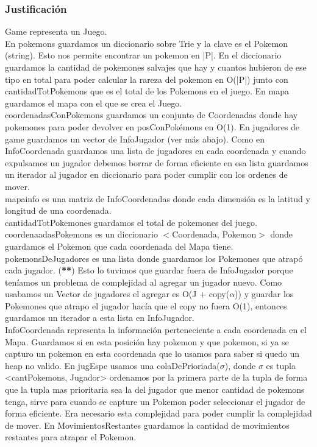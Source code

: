 \begin{Representacion}

\subsubsection{Justificación}
Game representa un Juego.\\
En pokemons guardamos un diccionario sobre Trie y la clave es el Pokemon (string). Esto nos permite encontrar un pokemon en |P|. En el diccionario guardamos la cantidad de pokemones salvajes que hay y cuantos hubieron de ese tipo en total para poder calcular la rareza del pokemon en O(|P|) junto con cantidadTotPokemons que es el total de los Pokemons en el juego.
En mapa guardamos el mapa con el que se crea el Juego.\\
coordenadasConPokemons guardamos un conjunto de Coordenadas donde hay pokemones para poder devolver en posConPok\'emons en O(1).
En jugadores de game guardamos un vector de InfoJugador (ver m\'as abajo). Como en InfoCoordenada guardamos una lista de jugadores en cada coordenada y cuando expulsamos un jugador debemos borrar de forma eficiente en esa lista guardamos un iterador al jugador en diccionario para poder cumplir con los ordenes de mover.\\
mapainfo es una matriz de InfoCoordenadas donde cada dimensi\'on es la latitud y longitud de una coordenada.\\
cantidadTotPokemones guardamos el total de pokemones del juego.\\
coordenaadasPokemons es un diccionario $<$Coordenada, Pokemon$>$ donde guardamos el Pokemon que cada coordenada del Mapa tiene.\\
pokemonsDeJugadores es una lista donde guardamos los Pokemones que atrapó cada jugador. (\textbf{**}) Esto lo tuvimos que guardar fuera de InfoJugador porque ten\'iamos un problema de complejidad al agregar un jugador nuevo. Como usabamos un Vector de jugadores el agregar es O(J + copy($\alpha$)) y guardar los Pokemones que atrapo el jugador hacía que el copy no fuera O(1), entonces guardamos un iterador a esta lista en InfoJugador.\\
InfoCoordenada representa la informaci\'on perteneciente a cada coordenada en el Mapa. Guardamos si en esta posici\'on hay pokemon y que pokemon, si ya se capturo un pokemon en esta coordenada que lo usamos para saber si quedo un heap no valido. En jugEspe usamos una colaDePrioriada($\sigma$), donde $\sigma$ es tupla <cantPokemons, Jugador> ordenamos por la primera parte de la tupla de forma que la tupla mas prioritaria sea la del jugador que menor cantidad de pokemons tenga, sirve para cuando se capture un Pokemon poder seleccionar el jugador de forma eficiente. Era necesario esta complejidad para poder cumplir la complejidad de mover. En MovimientosRestantes guardamos la cantidad de movimientos restantes para atrapar el Pokemon.\\

\end{Representacion}

